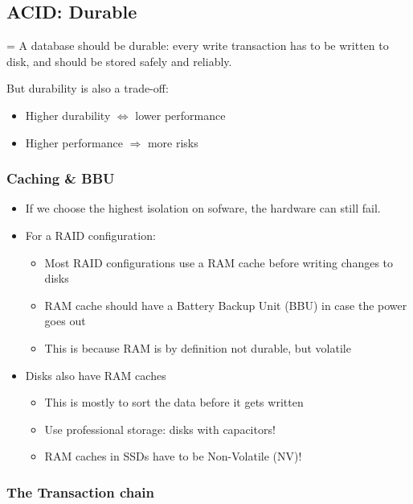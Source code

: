 \documentclass{article}
\begin{document}
\subsection{ACID: Durable}

= A database should be durable: every write transaction has to be written to disk, and should be stored safely and reliably.

But durability is also a trade-off: 

\begin{itemize}
    \item Higher durability $\Leftrightarrow$ lower performance
    \item Higher performance $\Rightarrow$ more risks
\end{itemize}


\subsubsection{Caching \& BBU}


\begin{itemize}
    \item If we choose the highest isolation on sofware, the hardware can still fail.
    \item For a RAID configuration:
    \begin{itemize}
        \item Most RAID configurations use a RAM cache before writing changes to disks
        \item RAM cache should have a Battery Backup Unit (BBU) in case the power goes out
        \item This is because RAM is by definition not durable, but volatile
    \end{itemize}
    \item Disks also have RAM caches
    \begin{itemize}
        \item This is mostly to sort the data before it gets written
        \item Use professional storage: disks with capacitors!
        \item RAM caches in SSDs have to be Non-Volatile (NV)!
    \end{itemize}
\end{itemize}

\subsubsection{The Transaction chain}
\end{document}
